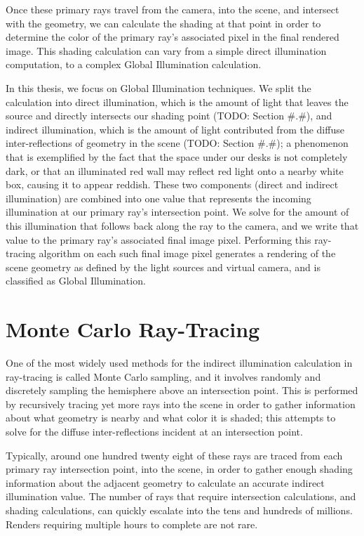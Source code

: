 Once these primary rays travel from the camera, into the scene, and intersect with the geometry, we can calculate the shading at that point in order to determine the color of the primary ray’s associated pixel in the final rendered image. This shading calculation can vary from a simple direct illumination computation, to a complex Global Illumination calculation.

In this thesis, we focus on Global Illumination techniques. We split the calculation into direct illumination, which is the amount of light that leaves the source and directly intersects our shading point (TODO: Section \#.\#), and indirect illumination, which is the amount of light contributed from the diffuse inter-reflections of geometry in the scene (TODO: Section \#.\#); a phenomenon that is exemplified by the fact that the space under our desks is not completely dark, or that an illuminated red wall may reflect red light onto a nearby white box, causing it to appear reddish. These two components (direct and indirect illumination) are combined into one value that represents the incoming illumination at our primary ray’s intersection point. We solve for the amount of this illumination that follows back along the ray to the camera, and we write that value to the primary ray’s associated final image pixel. Performing this ray-tracing algorithm on each such final image pixel generates a rendering of the scene geometry as defined by the light sources and virtual camera, and is classified as Global Illumination.

\section{Monte Carlo Ray-Tracing}
One of the most widely used methods for the indirect illumination calculation in ray-tracing is called Monte Carlo sampling, and it involves randomly and discretely sampling the hemisphere above an intersection point. This is performed by recursively tracing yet more rays into the scene in order to gather information about what geometry is nearby and what color it is shaded; this attempts to solve for the diffuse inter-reflections incident at an intersection point. 

Typically, around one hundred twenty eight of these rays are traced from each primary ray intersection point, into the scene, in order to gather enough shading information about the adjacent geometry to calculate an accurate indirect illumination value. The number of rays that require intersection calculations, and shading calculations, can quickly escalate into the tens and hundreds of millions. Renders requiring multiple hours to complete are not rare.


